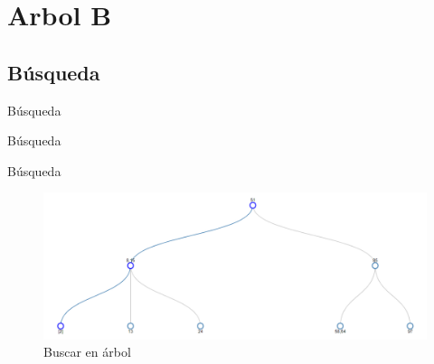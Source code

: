 \documentclass[11pt]{beamer}
\begin{document}
	\section{Arbol B}
	    \subsection{Búsqueda} %
		\begin{frame}{Búsqueda}
			\justifying
			
			
			
			
		\end{frame}
		
		\begin{frame}{Búsqueda}
			\justifying
			
			
			
			
		\end{frame}
		
		\begin{frame}{Búsqueda}
			\justifying
			\begin{figure}[H]
				\centering
				\includegraphics[scale=0.35]{img/btree_bus_1.png}
				\caption{Buscar en árbol}
				\label{fig:btree_bus_1}
			\end{figure}
		\end{frame}
		
\end{document}
